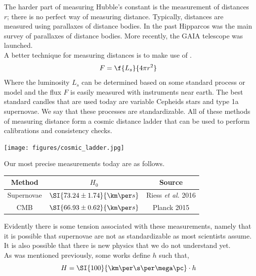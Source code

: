 \documentclass{article}
\begin{document}
The harder part of measuring Hubble's constant is the measurement of distances $r$; there is no perfect way of measuring distance. Typically, distances are measured using parallaxes of distance bodies. In the past Hipparcos was the main survey of parallaxes of distance bodies. More recently, the GAIA telescope was launched. \\

A better technique for measuring distances is to make use of .
\[ F = \f{L_s}{4 \pi r^2} \]
Where the luminosity $L_s$ can be determined based on some standard process or model and the flux $F$ is easily measured with instruments near earth. The best standard candles that are used today are variable Cepheids stars and type 1a supernovae. We say that these processes are standardizable. All of these methods of measuring distance form a cosmic distance ladder that can be used to perform calibrations and consistency checks.\\

\begin{center}
    \texttt{[image: figures/cosmic\_ladder.jpg]}
\end{center}

Our most precise measurements today are as follows.
\begin{center}
\begin{tabular}{|c|c|c|}
    \hline
    Method & $H_0$ & Source\\
    \hline
    Supernovae & $\SI{73.24 \pm 1.74}{\km \per s}$ & Riess \textit{et al.} 2016\\
    CMB & $\SI{66.93 \pm 0.62}{\km \per s}$ & Planck 2015\\
    \hline
\end{tabular}
\end{center}
Evidently there is some tension associated with these measurements, namely that it is possible that supernovae are not as standardizable as most scientists assume. It is also possible that there is new physics that we do not understand yet.\\

As was mentioned previously, some works define $h$ such that,
\[ H = \SI{100}{\km \per \s \per \mega\pc} \cdot h \]
\end{document}
